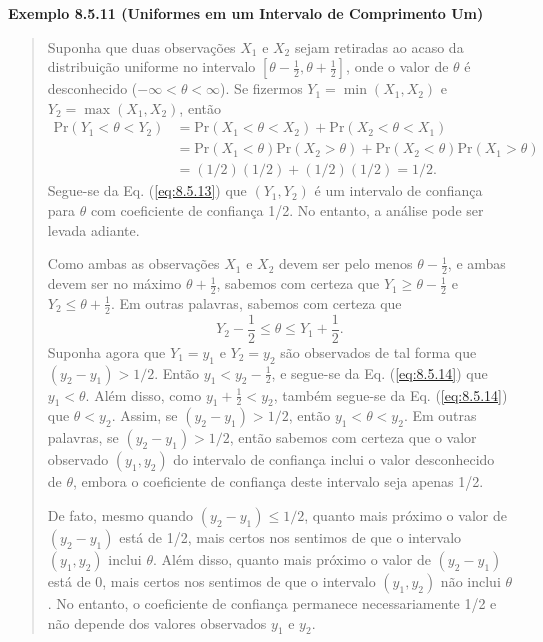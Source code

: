 \vspace{1em}
\noindent\textbf{Exemplo 8.5.11 (Uniformes em um Intervalo de Comprimento Um)}
\begin{quote}
    Suponha que duas observações $X_1$ e $X_2$ sejam retiradas ao acaso da distribuição uniforme no intervalo $[\theta - \frac{1}{2}, \theta + \frac{1}{2}]$, onde o valor de $\theta$ é desconhecido ($-\infty < \theta < \infty$). Se fizermos $Y_1 = \min(X_1, X_2)$ e $Y_2 = \max(X_1, X_2)$, então
    \begin{align} \label{eq:8.5.13}
        \text{Pr}(Y_1 < \theta < Y_2) &= \text{Pr}(X_1 < \theta < X_2) + \text{Pr}(X_2 < \theta < X_1) \nonumber \\
        &= \text{Pr}(X_1 < \theta) \text{Pr}(X_2 > \theta) + \text{Pr}(X_2 < \theta) \text{Pr}(X_1 > \theta) \nonumber \\
        &= (1/2)(1/2) + (1/2)(1/2) = 1/2.
    \end{align}
    Segue-se da Eq. (\ref{eq:8.5.13}) que $(Y_1, Y_2)$ é um intervalo de confiança para $\theta$ com coeficiente de confiança 1/2. No entanto, a análise pode ser levada adiante.

    Como ambas as observações $X_1$ e $X_2$ devem ser pelo menos $\theta - \frac{1}{2}$, e ambas devem ser no máximo $\theta + \frac{1}{2}$, sabemos com certeza que $Y_1 \ge \theta - \frac{1}{2}$ e $Y_2 \le \theta + \frac{1}{2}$. Em outras palavras, sabemos com certeza que
    \begin{equation} \label{eq:8.5.14}
        Y_2 - \frac{1}{2} \le \theta \le Y_1 + \frac{1}{2}.
    \end{equation}
    Suponha agora que $Y_1 = y_1$ e $Y_2 = y_2$ são observados de tal forma que $(y_2 - y_1) > 1/2$. Então $y_1 < y_2 - \frac{1}{2}$, e segue-se da Eq. (\ref{eq:8.5.14}) que $y_1 < \theta$. Além disso, como $y_1 + \frac{1}{2} < y_2$, também segue-se da Eq. (\ref{eq:8.5.14}) que $\theta < y_2$. Assim, se $(y_2 - y_1) > 1/2$, então $y_1 < \theta < y_2$. Em outras palavras, se $(y_2 - y_1) > 1/2$, então sabemos com certeza que o valor observado $(y_1, y_2)$ do intervalo de confiança inclui o valor desconhecido de $\theta$, embora o coeficiente de confiança deste intervalo seja apenas 1/2.

    De fato, mesmo quando $(y_2 - y_1) \le 1/2$, quanto mais próximo o valor de $(y_2 - y_1)$ está de 1/2, mais certos nos sentimos de que o intervalo $(y_1, y_2)$ inclui $\theta$. Além disso, quanto mais próximo o valor de $(y_2 - y_1)$ está de 0, mais certos nos sentimos de que o intervalo $(y_1, y_2)$ não inclui $\theta$. No entanto, o coeficiente de confiança permanece necessariamente 1/2 e não depende dos valores observados $y_1$ e $y_2$.


\end{quote}

